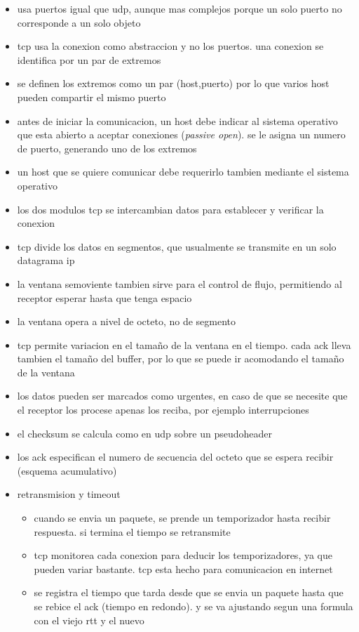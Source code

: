\documentclass[11pt]{article}
\begin{document}
\begin{itemize}
\item usa puertos igual que udp, aunque mas complejos porque un solo puerto no corresponde a un solo objeto
\item tcp usa la conexion como abstraccion y no los puertos. una conexion se identifica por un par de extremos
\item se definen los extremos como un par (host,puerto) por lo que varios host pueden compartir el mismo puerto
\item antes de iniciar la comunicacion, un host debe indicar al sistema operativo que esta abierto a aceptar conexiones (\emph{passive open}). se le asigna un numero de puerto, generando uno de los extremos
\item un host que se quiere comunicar debe requerirlo tambien mediante el sistema operativo
\item los dos modulos tcp se intercambian datos para establecer y verificar la conexion
\item tcp divide los datos en segmentos, que usualmente se transmite en un solo datagrama ip
\item la ventana semoviente tambien sirve para el control de flujo, permitiendo al receptor esperar hasta que tenga espacio
\item la ventana opera a nivel de octeto, no de segmento
\item tcp permite variacion en el tamaño de la ventana en el tiempo. cada ack lleva tambien el tamaño del buffer, por lo que se puede ir acomodando el tamaño de la ventana
\item los datos pueden ser marcados como urgentes, en caso de que se necesite que el receptor los procese apenas los reciba, por ejemplo interrupciones
\item el checksum se calcula como en udp sobre un pseudoheader
\item los ack especifican el numero de secuencia del octeto que se espera recibir (esquema acumulativo)
\item retransmision y timeout
\begin{itemize}
\item cuando se envia un paquete, se prende un temporizador hasta recibir respuesta. si termina el tiempo se retransmite
\item tcp monitorea cada conexion para deducir los temporizadores, ya que pueden variar bastante. tcp esta hecho para comunicacion en internet
\item se registra el tiempo que tarda desde que se envia un paquete hasta que se rebice el ack (tiempo en redondo). y se va ajustando segun una formula con el viejo rtt y el nuevo

\end{itemize}
\end{itemize}
\end{document}
